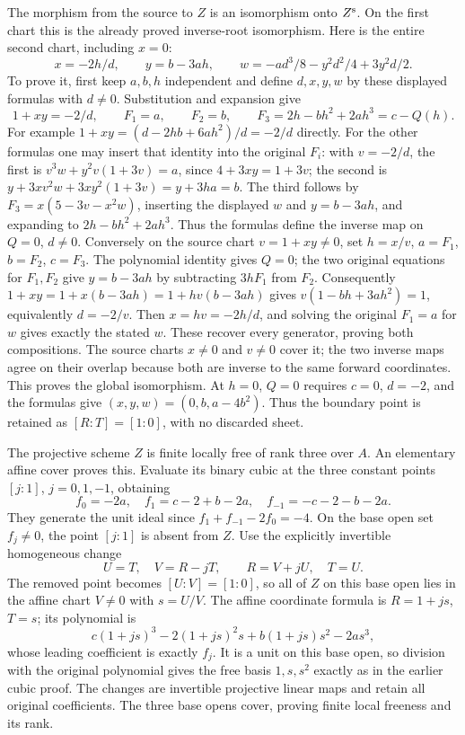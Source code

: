 The morphism from the source to $Z$ is an isomorphism onto $Z^{\rm s}$.
On the first chart this is the already proved inverse-root isomorphism.
Here is the entire second chart, including $x=0$:
\[
 x=-2h/d,\qquad y=b-3ah,\qquad
 w=-ad^3/8-y^2d^2/4+3y^2d/2.
\]
To prove it, first keep $a,b,h$ independent and define $d,x,y,w$ by
these displayed formulas with $d\ne0$. Substitution and expansion give
\[
 1+xy=-2/d,\qquad
 F_1=a,\qquad F_2=b,\qquad F_3=2h-bh^2+2ah^3=c-Q(h).
\]
For example $1+xy=(d-2hb+6ah^2)/d=-2/d$ directly. For the other
formulas one may insert that identity into the original $F_i$:
with $v=-2/d$, the first is
$v^3w+y^2v(1+3v)=a$, since $4+3xy=1+3v$;
the second is
$y+3xv^2w+3xy^2(1+3v)=y+3ha=b$.
The third follows by $F_3=x(5-3v-x^2w)$, inserting the displayed
$w$ and $y=b-3ah$, and expanding to $2h-bh^2+2ah^3$.
Thus the formulas define the inverse map on $Q=0$, $d\ne0$.
Conversely on the source chart $v=1+xy\ne0$, set $h=x/v$,
$a=F_1$, $b=F_2$, $c=F_3$. The polynomial identity gives $Q=0$;
the two original equations for $F_1,F_2$ give
$y=b-3ah$ by subtracting $3hF_1$ from $F_2$.
Consequently
$1+xy=1+x(b-3ah)=1+hv(b-3ah)$ gives
$v(1-bh+3ah^2)=1$, equivalently $d=-2/v$.
Then $x=hv=-2h/d$, and solving the original $F_1=a$ for $w$
gives exactly the stated $w$. These recover every generator, proving
both compositions. The source charts $x\ne0$ and $v\ne0$ cover it;
the two inverse maps agree on their overlap because both are inverse
to the same forward coordinates. This proves the global isomorphism.
At $h=0$, $Q=0$ requires $c=0$, $d=-2$, and the formulas give
$(x,y,w)=(0,b,a-4b^2)$. Thus the boundary point is retained as
$[R:T]=[1:0]$, with no discarded sheet.

The projective scheme $Z$ is finite locally free of rank three over
$A$. An elementary affine cover proves this. Evaluate its binary cubic
at the three constant points $[j:1]$, $j=0,1,-1$, obtaining
\[
 f_0=-2a,\quad f_1=c-2+b-2a,\quad f_{-1}=-c-2-b-2a.
\]
They generate the unit ideal since $f_1+f_{-1}-2f_0=-4$.
On the base open set $f_j\ne0$, the point $[j:1]$ is absent from $Z$.
Use the explicitly invertible homogeneous change
\[
 U=T,\quad V=R-jT,\qquad R=V+jU,\quad T=U.
\]
The removed point becomes $[U:V]=[1:0]$, so all of $Z$ on this
base open lies in the affine chart $V\ne0$ with $s=U/V$.
The affine coordinate formula is $R=1+js$, $T=s$; its polynomial is
\[
 c(1+js)^3-2(1+js)^2s+b(1+js)s^2-2as^3,
\]
whose leading coefficient is exactly $f_j$. It is a unit on this
base open, so division with the original polynomial gives the free
basis $1,s,s^2$ exactly as in the earlier cubic proof. The changes
are invertible projective linear maps and retain all original
coefficients. The three base opens cover, proving finite local
freeness and its rank.

